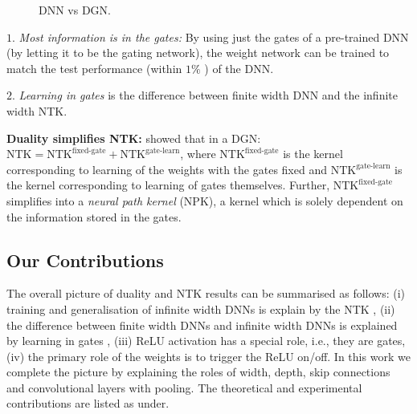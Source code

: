 \begin{figure}
\centering
{}
\caption{DNN vs DGN.}
\label{fig:dgn}
\end{figure}
$1.$ \emph{Most information is in the gates:} By using just the gates of a pre-trained DNN (by letting it to be the gating network), the weight network can be trained to match the test performance (within $1\%$ ) of the DNN.

$2.$ \emph{Learning in gates} is the difference between finite width DNN and the infinite width NTK.  

\textbf{Duality simplifies NTK:} \cite{npk} showed that in a DGN:$\text{NTK}=\text{NTK}^{\text{fixed-gate}}+\text{NTK}^{\text{gate-learn}}$, where $\text{NTK}^{\text{fixed-gate}}$ is the kernel corresponding to learning of the weights with the gates fixed and $\text{NTK}^{\text{gate-learn}}$ is the kernel corresponding to learning of gates themselves. Further, $\text{NTK}^{\text{fixed-gate}}$ simplifies into a \emph{neural path kernel} (NPK), a kernel which is solely dependent on the information stored in the gates.



\subsection{Our Contributions}
The overall picture of duality and NTK results can be summarised  as follows: (i) training and generalisation of infinite width DNNs is explain by the NTK \cite{arora2019exact,cao2019generalization}, (ii) the difference between finite width DNNs and infinite width DNNs is explained by learning in gates \cite{npk}, (iii) ReLU activation has a special role, i.e., they are gates, (iv) the primary role of the weights is to trigger the ReLU on/off. In this work we complete the picture by explaining the roles of width, depth, skip connections and convolutional layers with pooling.  The theoretical and experimental contributions are listed as under.

